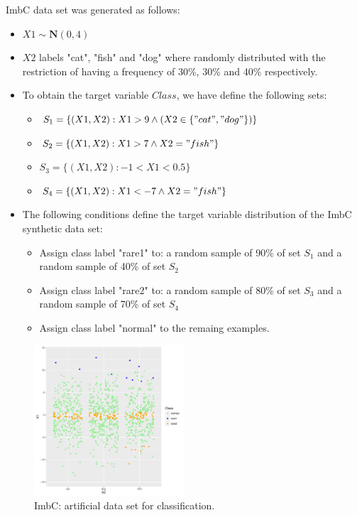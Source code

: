\documentclass[10pt,a4paper]{article}\usepackage[]{graphicx}\usepackage[]{color}
\newenvironment{knitrout}{}{} %
\begin{document}
ImbC data set was generated as follows:
\begin{itemize}
  \item $X1 \sim \mathbf{N} \left(0, 4\right)$
  \item $X2$ labels "cat", "fish" and "dog" where randomly distributed with the restriction of having a   frequency of 30\%, 30\% and 40\% respectively.
  \item To obtain the target variable $Class$, we have define the following sets:
  \begin{itemize}
    \item $S_1=\{(X1, X2) : X1 > 9 \wedge (X2 \in \{"cat", "dog"\})\}$
    \item $S_2=\{(X1, X2) : X1 > 7 \wedge X2 = "fish" \}$
    \item $S_3=\{(X1, X2) :-1  <  X1 < 0.5\}$
    \item $S_4=\{(X1, X2) : X1 < -7 \wedge X2 = "fish"\}$
  \end{itemize}
  \item The following conditions define the target variable distribution of the ImbC synthetic data set:
  \begin{itemize}
    \item Assign class label "rare1" to: a random sample of 90\% of set $S_1$ and a random sample of 40\% of set $S_2$
    \item Assign class label "rare2" to: a random sample of 80\% of set $S_3$ and a random sample of 70\% of set $S_4$
    \item Assign class label "normal" to the remaing examples.
  \end{itemize}
\end{itemize}


\begin{knitrout}\footnotesize
{}\color{fgcolor}\begin{figure}

{\centering \includegraphics[width=0.5\textwidth]{figures/UBL-OriginalC-1} 

}

\caption[ImbC]{ImbC: artificial data set for classification.}\label{fig:OriginalC}
\end{figure}


\end{knitrout}
\end{document}
